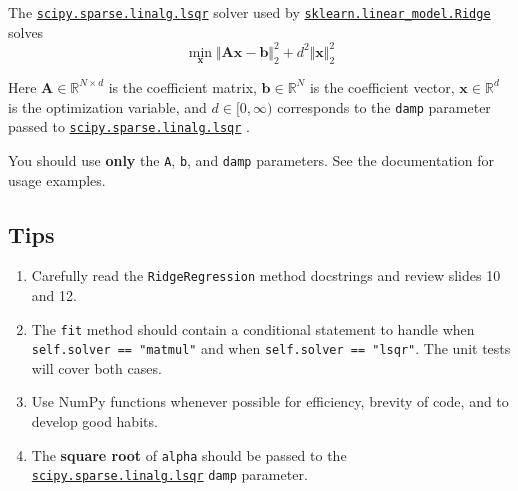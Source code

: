 \documentclass{article}
\numberwithin{equation}{section}
\newcommand{\lsqr}{%
    \href{%
        https://docs.scipy.org/doc/scipy/reference/generated/%
        scipy.sparse.linalg.lsqr.html%
    }{\texttt{scipy.sparse.linalg.lsqr}}%
}
\newcommand{\skridge}{%
    \href{%
        https://scikit-learn.org/stable/modules/generated/%
        sklearn.linear_model.Ridge.html%
    }{\texttt{sklearn.linear\_model.Ridge}}%
}
\begin{document}
The \lsqr{} solver used by \skridge{} solves
\begin{equation*}
    \min_\mathbf{x}\Vert\mathbf{Ax} - \mathbf{b}\Vert_2^2 +
    d^2\Vert\mathbf{x}\Vert_2^2
\end{equation*}

Here $ \mathbf{A} \in \mathbb{R}^{N \times d} $ is the coefficient matrix,
$ \mathbf{b} \in \mathbb{R}^N $ is the coefficient vector, $ \mathbf{x} \in
\mathbb{R}^d $ is the optimization variable, and $ d \in [0, \infty) $
corresponds to the \texttt{damp} parameter passed to \lsqr.

\medskip

You should use \textbf{only} the \texttt{A}, \texttt{b}, and \texttt{damp}
parameters. See the documentation for usage examples.

\subsection{Tips}

\begin{enumerate}
    \item
    Carefully read the \texttt{RidgeRegression} method docstrings and review
    slides 10 and 12.

    \item
    The \texttt{fit} method should contain a conditional statement to handle
    when \texttt{self.solver == "matmul"} and when
    \texttt{self.solver == "lsqr"}. The unit tests will cover both cases.

    \item
    Use NumPy functions whenever possible for efficiency, brevity of code, and
    to develop good habits.

    \item
    The \textbf{square root} of \texttt{alpha} should be passed to the \lsqr{}
    \texttt{damp} parameter.
\end{enumerate}
\end{document}
